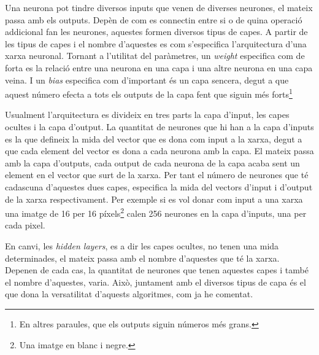 Una neurona pot tindre diversos inputs que venen de diverses neurones, el mateix passa amb els outputs. Depèn de com es connectin entre si o de quina operació addicional fan les neurones, aquestes formen diversos tipus de capes. A partir de les tipus de capes i el nombre d'aquestes es com s'especifica l'arquitectura d'una xarxa neuronal. Tornant a l'utilitat del paràmetres, un \textit{weight} especifica com de forta es la relació entre una neurona en una capa i una altre neurona en una capa veina. I un \textit{bias} especifica com d'important és un capa sencera, degut a que aquest número efecta a tots els outputs de la capa fent que siguin més forts\footnote{En altres paraules, que els outputs siguin números més grans.}

Usualment l'arquitectura es divideix en tres parts la capa d'input, les capes ocultes i la capa d'output. La quantitat de neurones que hi han a la capa d'inputs es la que defineix la mida del vector que es dona com input a la xarxa, degut a que cada element del vector es dona a cada neurona amb la capa. El mateix passa amb la capa d'outputs, cada output de cada neurona de la capa acaba sent un element en el vector que surt de la xarxa. Per tant el número de neurones que té cadascuna d'aquestes dues capes, especifica la mida del vectors d'input i d'output de la xarxa respectivament. Per exemple si es vol donar com input a una xarxa una imatge de 16 per 16 píxels\footnote{Una imatge en blanc i negre.} calen 256 neurones en la capa d'inputs, una per cada pixel. 

En canvi, les \textit{hidden layers}, es a dir les capes ocultes, no tenen una mida determinades, el mateix passa amb el nombre d'aquestes que té la xarxa. Depenen de cada cas, la quantitat de neurones que tenen aquestes capes i també el nombre d'aquestes, varia. Això, juntament amb el diversos tipus de capa és el que dona la versatilitat d'aquests algoritmes, com ja he comentat. 
 
